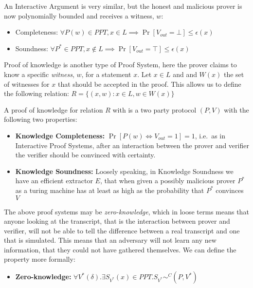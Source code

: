 \documentclass[
]{article}
\providecommand{\tightlist}{%
  \setlength{\itemsep}{0pt}\setlength{\parskip}{0pt}}
\begin{document}
An Interactive Argument is very similar, but the honest and malicious
prover is now polynomially bounded and receives a witness, \(w\):

\begin{itemize}
\tightlist
\item
  Completeness:
  \(\forall P(w) \in PPT, x\in L \implies \Pr[V_{out} = \bot] \leq \epsilon(x)\)
\item
  Soundness:
  \(\forall P^* \in PPT, x \notin L \implies \Pr[V_{out} = \top] \leq \epsilon(x)\)
\end{itemize}

Proof of knowledge is another type of Proof System, here the prover
claims to know a specific \emph{witness}, \(w\), for a statement \(x\).
Let \(x \in L\) and and \(W(x)\) the set of witnesses for \(x\) that
should be accepted in the proof. This allows us to define the following
relation: \(R = \{ (x,w) :
x \in L , w \in W(x) \}\)

A proof of knowledge for relation \(R\) with is a two party protocol
\((P, V)\) with the following two properties:

\begin{itemize}
\tightlist
\item
  \textbf{Knowledge Completeness:} \(\Pr[P(w) \iff V_{out} = 1] = 1\),
  i.e.~as in Interactive Proof Systems, after an interaction between the
  prover and verifier the verifier should be convinced with certainty.\\
\item
  \textbf{Knowledge Soundness:} Loosely speaking, in Knowledge Soundness
  we have an efficient extractor \(E\), that when given a possibly
  malicious prover \(P^*\) as a turing machine has at least as high as
  the probability that \(P^*\) convinces \(V\)
\end{itemize}

The above proof systems may be \emph{zero-knowledge}, which in loose
terms means that anyone looking at the transcript, that is the
interaction between prover and verifier, will not be able to tell the
difference between a real transcript and one that is simulated. This
means that an adversary will not learn any new information, that they
could not have gathered themselves. We can define the property more
formally:

\begin{itemize}
\tightlist
\item
  \textbf{Zero-knowledge:}
  \(\forall V^*(\delta). \exists S_{V^*}(x) \in PPT. S_{V^*} \sim^C (P,V^*)\)
\end{itemize}
\end{document}
